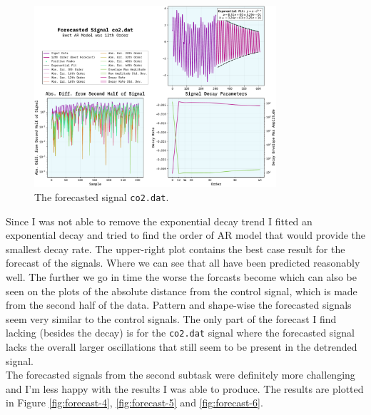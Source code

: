 \documentclass[10pt, titlepage, a4paper]{article}
\begin{document}
\begin{figure}[H]
    \centering
    \includegraphics[width=0.8\textwidth]{../LinForecast/Images/forecast-co2.dat.pdf}
    \caption{The forecasted signal \texttt{co2.dat}.}
    \label{fig:forecast-3}
\end{figure}

Since I was not able to remove the exponential decay trend I fitted an exponential decay and tried to find the order 
of AR model that would provide the smallest decay rate. The upper-right plot contains the best case result for the 
forecast of the signals. Where we can see that all have been predicted reasonably well. The further we go in time 
the worse the forcasts become which can also be seen on the plots of the absolute distance from the control signal, 
which is made from the second half of the data. Pattern and shape-wise the forecasted signals seem very similar to the 
control signals. The only part of the forecast I find lacking (besides the decay) is for the \texttt{co2.dat} signal 
where the forecasted signal lacks the overall larger oscillations that still seem to be present in the detrended signal. \\

The forecasted signals from the second subtask were definitely more challenging and I'm less happy with the results I was 
able to produce. The results are plotted in Figure \ref{fig:forecast-4}, \ref{fig:forecast-5} and \ref{fig:forecast-6}.
\end{document}

